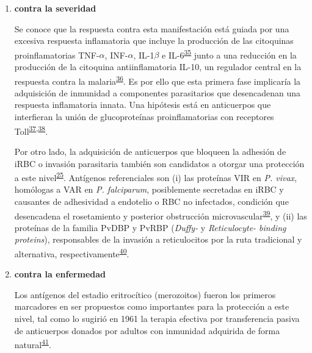 \documentclass[a4paper]{article}
\begin{document}
\begin{enumerate}
\begin{enumerate}
    \begin{enumerate}
    \def\labelenumiii{\arabic{enumiii}.}
    \item
      \textbf{contra la severidad}

      Se conoce que la respuesta contra esta manifestación está guiada
      por una excesiva respuesta inflamatoria que incluye la producción
      de las citoquinas proinflamatorias TNF-\(\alpha\), INF-\(\alpha\),
      IL-1\(\beta\) e
      IL-6\textsuperscript{\protect\hyperlink{ref-baird2013}{35}} junto
      a una reducción en la producción de la citoquina antiinflamatoria
      IL-10, un regulador central en la respuesta contra la
      malaria\textsuperscript{\protect\hyperlink{ref-jagannathan2014}{36}}.
      Es por ello que esta primera fase implicaría la adquisición de
      inmunidad a componentes parasitarios que desencadenan una
      respuesta inflamatoria innata. Una hipótesis está en anticuerpos
      que interfieran la unión de glucoproteínas proinflamatorias con
      receptores
      Toll\textsuperscript{\protect\hyperlink{ref-schofield2006toll}{37},\protect\hyperlink{ref-coban2005toll}{38}}.

      Por otro lado, la adquisición de anticuerpos que bloqueen la
      adhesión de iRBC o invasión parasitaria también son candidatos a
      otorgar una protección a este
      nivel\textsuperscript{\protect\hyperlink{ref-wassmer2015}{25}}.
      Antígenos referenciales son (i) las proteínas VIR en \emph{P.
      vivax}, homólogas a VAR en \emph{P. falciparum}, posiblemente
      secretadas en iRBC y causantes de adhesividad a endotelio o RBC no
      infectados, condición que desencadena el rosetamiento y posterior
      obstrucción
      microvascular\textsuperscript{\protect\hyperlink{ref-portillo2001vir}{39}},
      y (ii) las proteínas de la familia PvDBP y PvRBP (\emph{Duffy-} y
      \emph{Reticulocyte- binding proteins}), responsables de la
      invasión a reticulocitos por la ruta tradicional y alternativa,
      respectivamente\textsuperscript{\protect\hyperlink{ref-galinski1992rbp}{40}}.
    \item
      \textbf{contra la enfermedad}

      Los antígenos del estadio eritrocítico (merozoitos) fueron los
      primeros marcadores en ser propuestos como importantes para la
      protección a este nivel, tal como lo sugirió en 1961 la terapia
      efectiva por transferencia pasiva de anticuerpos donados por
      adultos con inmunidad adquirida de forma
      natural\textsuperscript{\protect\hyperlink{ref-cohen1961}{41}}.


\end{enumerate}
\end{enumerate}
\end{enumerate}
\end{document}
